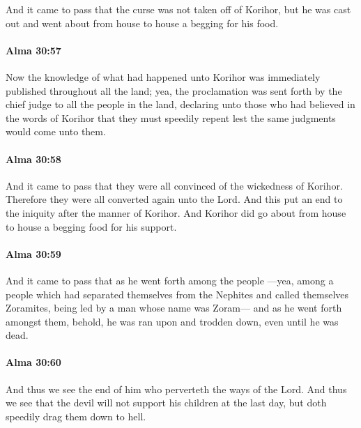 			And it came to pass that the curse was not taken off of Korihor,
			but he was cast out and went about from house to house a begging for his food.

		\paragraph{Alma 30:57} %
			\label{ALMA-30-57}

			Now the knowledge of what had happened unto Korihor
			was immediately published throughout all the land;
			yea, the proclamation was sent forth by the chief judge to all the people in the land,
			declaring unto those who had believed in the words of Korihor
			that they must speedily repent lest the same judgments would come unto them.

		\paragraph{Alma 30:58} %
			\label{ALMA-30-58}

			And it came to pass that they were all convinced of the wickedness of Korihor.
			Therefore they were all converted again unto the Lord.
			And this put an end to the iniquity after the manner of Korihor.
			And Korihor did go about from house to house a begging food for his support.

		\paragraph{Alma 30:59} %
			\label{ALMA-30-59}

			And it came to pass that as he went forth among the people
			---yea, among a people which had separated themselves from the Nephites
			and called themselves Zoramites, being led by a man whose name was Zoram---
			and as he went forth amongst them,
			behold, he was ran upon and trodden down, even until he was dead.

		\paragraph{Alma 30:60} %
			\label{ALMA-30-60}

			And thus we see the end of him who perverteth the ways of the Lord.
			And thus we see that the devil will not support his children at the last day,
			but doth speedily drag them down to hell.

